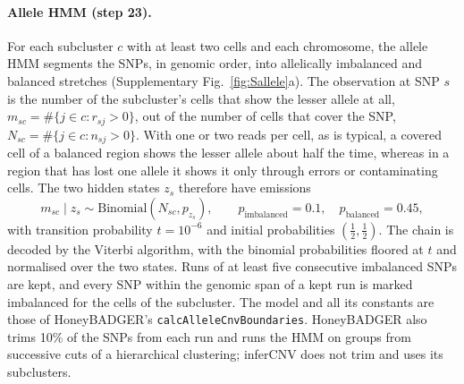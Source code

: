 \paragraph{Allele HMM (step 23).}
For each subcluster $c$ with at least two cells and each chromosome, the allele HMM segments the SNPs, in genomic order, into allelically imbalanced and balanced stretches (Supplementary Fig.~\ref{fig:Sallele}a). The observation at SNP $s$ is the number of the subcluster's cells that show the lesser allele at all, $m_{sc}=\#\{j\in c: r_{sj}>0\}$, out of the number of cells that cover the SNP, $N_{sc}=\#\{j\in c: n_{sj}>0\}$. With one or two reads per cell, as is typical, a covered cell of a balanced region shows the lesser allele about half the time, whereas in a region that has lost one allele it shows it only through errors or contaminating cells. The two hidden states $z_s$ therefore have emissions
\begin{equation}
m_{sc}\mid z_s \sim \mathrm{Binomial}(N_{sc}, p_{z_s}),\qquad p_{\mathrm{imbalanced}} = 0.1,\quad p_{\mathrm{balanced}}=0.45,
\end{equation}
with transition probability $t=10^{-6}$ and initial probabilities $(\tfrac12,\tfrac12)$. The chain is decoded by the Viterbi algorithm, with the binomial probabilities floored at $t$ and normalised over the two states. Runs of at least five consecutive imbalanced SNPs are kept, and every SNP within the genomic span of a kept run is marked imbalanced for the cells of the subcluster. The model and all its constants are those of HoneyBADGER's \texttt{calcAlleleCnvBoundaries}. HoneyBADGER also trims 10\% of the SNPs from each run and runs the HMM on groups from successive cuts of a hierarchical clustering; inferCNV does not trim and uses its subclusters.

